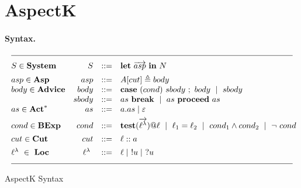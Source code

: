 \documentclass[a4paper]{llncs}
\makeatletter
\newcommand{\Let}{{\bf let}}
\newcommand{\Letin}{{\bf in}}
\newcommand{\Test}[2]{{\bf test}({#1})@{\it #2}}
\newcommand{\Proceed}{{\bf proceed}}
\newcommand{\adefn}[3]{#1[#2]\triangleq#3}
\newcommand{\Lnt}{\ell^\lambda}
\newcommand{\Ln}{\ell}
\newcommand{\Lc}{\ell}
\newcommand{\Lbt}{\ell^\lambda}
\newcommand{\Lb}{\ell}
\newcommand{\veck}[1]{\overrightarrow{#1}}
\newcommand{\Break}{{\bf break}}
\newcommand{\Case}{{\bf case}}
\newenvironment{ARRAY}[1]{%
  \begin{tabular*}{\textwidth}{@{\extracolsep{\fill}}c@{}c@{}c}
  \hline
  &&\\[-5pt]
  &\begin{math}\begin{array}{@{} #1 @{}}
}
{ \end{array}\end{math}&\\
  &&\\[-5pt]
  \hline
  \end{tabular*}
}
\makeatother
\begin{document}




\section{AspectK}\label{sec:syntax}

\paragraph{Syntax.}





\begin{table}[t]
$$
\begin{ARRAY}{lrcl}
S \in {\bf System} &
S & ::= & \Let\
\overrightarrow{asp}\ %
\Letin\ N
\\[1ex]
asp  \in  {\bf Asp} &
asp & ::= & \adefn{A}{cut} body 
\\
body \in {\bf Advice} &
body & ::= & \Case \ (cond) \ sbody \ ; \ body 
\ \mid\ sbody \\
& sbody & ::= & as\ \Break\ \mid\  as\ \Proceed\ as \\
as \in {\bf Act}^*
& as & ::= & a.as \mid \varepsilon
\\[1ex]
cond \in {\bf BExp} & 
cond & ::= & %
\Test{\veck{\Lbt}}{\Lb}\  %
\mid \ \ell_1 = \ell_2 \ 
\mid \  cond_1  \land  cond_2  \ \mid \ \neg \ cond \

\\[1ex]
cut  \in  {\bf Cut} &
cut & ::= & \Lc :: a

\\[1ex]
\Lnt \ \in \ {\bf Loc}&
\Lnt\ & ::= & \Ln \mid\ !u \mid\ ?u

\end{ARRAY}
$$

\caption{AspectK Syntax} \label{tab:syn_Aspects}
\end{table}
\end{document}
